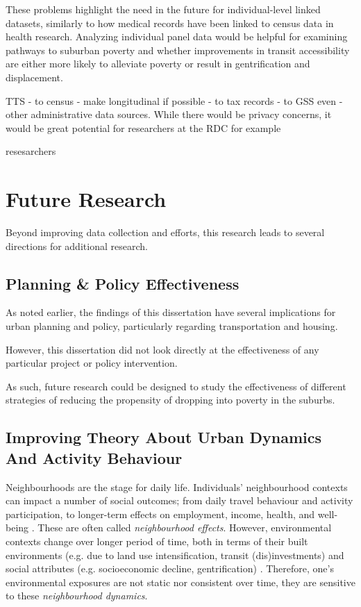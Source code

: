 These problems highlight the need in the future for individual-level linked datasets, similarly to how medical records have been linked to census data in health research. Analyzing individual panel data would be helpful for examining pathways to suburban poverty and whether improvements in transit accessibility are either more likely to alleviate poverty or result in gentrification and displacement.

TTS - to census - make longitudinal if possible - to tax records - to GSS even - other administrative data sources. While there would be privacy concerns, it would be great potential for researchers at the RDC for example


resesarchers
\section{Future Research}

Beyond improving data collection and efforts, this research leads to several directions for additional research.




\subsection{Planning \& Policy Effectiveness}

As noted earlier, the findings of this dissertation have several implications for urban planning and policy, particularly regarding transportation and housing. 

However, this dissertation did not look directly at the effectiveness of any particular project or policy intervention. 

As such, future research could be designed to study the effectiveness of different strategies of reducing the propensity of dropping into poverty in the suburbs.






\subsection{Improving Theory About Urban Dynamics And Activity Behaviour}


Neighbourhoods are the stage for daily life. Individuals' neighbourhood contexts can impact a number of social outcomes; from daily travel behaviour and activity participation, to longer-term effects on employment, income, health, and well-being \cite{sampson_assessing_2002,ewing_travel_2010,lucas_transport_2012,bastiaanssen_does_2020}. These are often called \textit{neighbourhood effects}. However, environmental contexts change over longer period of time, both in terms of their built environments (e.g. due to land use intensification, transit (dis)investments) and social attributes (e.g. socioeconomic decline, gentrification) \cite{van_ham_understanding_2013,wegener_land-use_2004}. Therefore, one's environmental exposures are not static nor consistent over time, they are sensitive to these \textit{neighbourhood dynamics}. 

